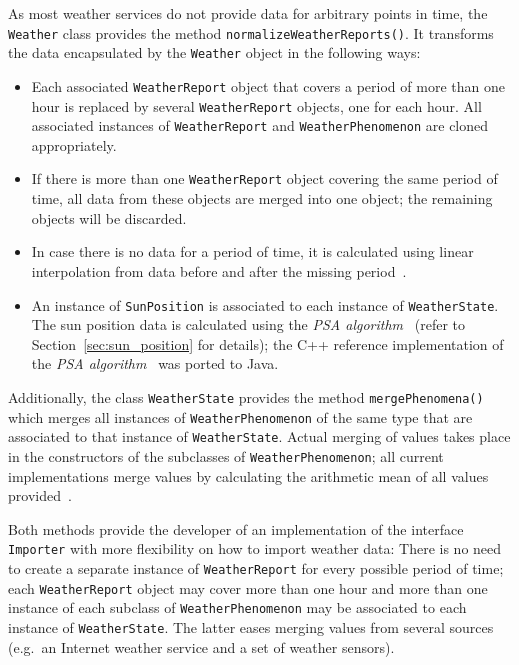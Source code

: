 As most weather services do not provide data for arbitrary points in time, the \texttt{Weather} class provides the method \texttt{normalizeWeatherReports()}. It transforms the data encapsulated by the \texttt{Weather} object in the following ways:
\begin{itemize}
  \item Each associated \texttt{WeatherReport} object that covers a period of more than one hour is replaced by several \texttt{WeatherReport} objects, one for each hour. All associated instances of \texttt{WeatherReport} and \texttt{WeatherPhenomenon} are cloned appropriately.
  
  \item If there is more than one \texttt{WeatherReport} object covering the same period of time, all data from these objects are merged into one object; the remaining objects will be discarded.
  
  \item In case there is no data for a period of time, it is calculated using linear interpolation from data before and after the missing period~\cite{maths}.
  
  \item An instance of \texttt{SunPosition} is associated to each instance of \texttt{WeatherState}. The sun position data is calculated using the \emph{PSA algorithm}~\cite{PSA_algorithm} (refer to Section~\ref{sec:sun_position} for details); the C++ reference implementation of the \emph{PSA algorithm}~\cite{psa_online} was ported to Java.
\end{itemize}

Additionally, the class \texttt{WeatherState} provides the method \texttt{mergePhenomena()} which merges all instances of \texttt{WeatherPhenomenon} of the same type that are associated to that instance of \texttt{WeatherState}. Actual merging of values takes place in the constructors of the subclasses of \texttt{WeatherPhenomenon}; all current implementations merge values by calculating the arithmetic mean of all values provided~\cite{maths}.

Both methods provide the developer of an implementation of the interface \texttt{Importer} with more flexibility on how to import weather data: There is no need to create a separate instance of \texttt{WeatherReport} for every possible period of time; each \texttt{WeatherReport} object may cover more than one hour and more than one instance of each subclass of \texttt{WeatherPhenomenon} may be associated to each instance of \texttt{WeatherState}. The latter eases merging values from several sources (e.g.\ an Internet weather service and a set of weather sensors).


